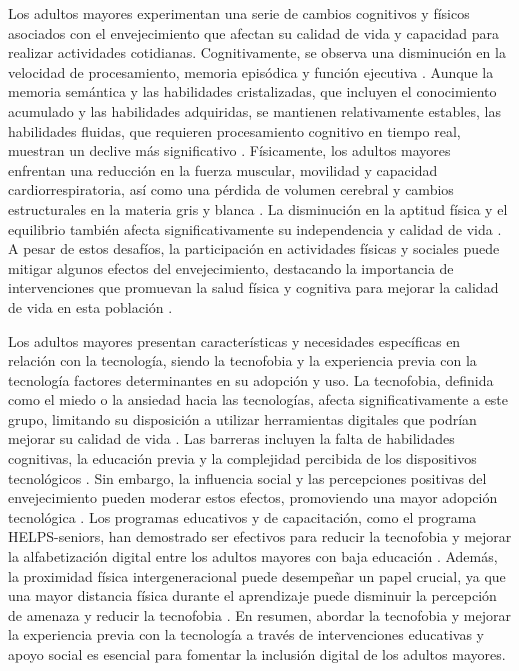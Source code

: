 Los adultos mayores experimentan una serie de cambios cognitivos y físicos asociados con el envejecimiento que afectan su calidad de vida y capacidad para realizar actividades cotidianas. Cognitivamente, se observa una disminución en la velocidad de procesamiento, memoria episódica y función ejecutiva \cite{hughes_change_2018, murman_impact_2015, van_patten_appreciating_2021, american_psychological_association_older_2021}. Aunque la memoria semántica y las habilidades cristalizadas, que incluyen el conocimiento acumulado y las habilidades adquiridas, se mantienen relativamente estables, las habilidades fluidas, que requieren procesamiento cognitivo en tiempo real, muestran un declive más significativo \cite{harada_normal_2013}. Físicamente, los adultos mayores enfrentan una reducción en la fuerza muscular, movilidad y capacidad cardiorrespiratoria, así como una pérdida de volumen cerebral y cambios estructurales en la materia gris y blanca \cite{song_physical_2023, preston_physiology_2021, hughes_change_2018}. La disminución en la aptitud física y el equilibrio también afecta significativamente su independencia y calidad de vida \cite{wrights_assessing_2015}. A pesar de estos desafíos, la participación en actividades físicas y sociales puede mitigar algunos efectos del envejecimiento, destacando la importancia de intervenciones que promuevan la salud física y cognitiva para mejorar la calidad de vida en esta población \cite{martins_observational_2024, wrights_assessing_2015}.

Los adultos mayores presentan características y necesidades específicas en relación con la tecnología, siendo la tecnofobia y la experiencia previa con la tecnología factores determinantes en su adopción y uso. La tecnofobia, definida como el miedo o la ansiedad hacia las tecnologías, afecta significativamente a este grupo, limitando su disposición a utilizar herramientas digitales que podrían mejorar su calidad de vida \cite{hogan_technophobia_2006}. Las barreras incluyen la falta de habilidades cognitivas, la educación previa y la complejidad percibida de los dispositivos tecnológicos \cite{longe_technophobia_2007, thalib_older_2019}. Sin embargo, la influencia social y las percepciones positivas del envejecimiento pueden moderar estos efectos, promoviendo una mayor adopción tecnológica \cite{xi_when_2022}. Los programas educativos y de capacitación, como el programa HELPS-seniors, han demostrado ser efectivos para reducir la tecnofobia y mejorar la alfabetización digital entre los adultos mayores con baja educación \cite{wang_overcoming_2015}. Además, la proximidad física intergeneracional puede desempeñar un papel crucial, ya que una mayor distancia física durante el aprendizaje puede disminuir la percepción de amenaza y reducir la tecnofobia \cite{xi_when_2022}. En resumen, abordar la tecnofobia y mejorar la experiencia previa con la tecnología a través de intervenciones educativas y apoyo social es esencial para fomentar la inclusión digital de los adultos mayores.

